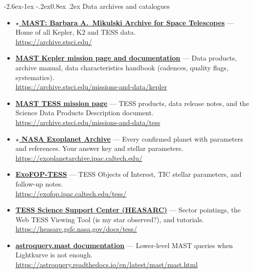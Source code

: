 \documentclass[11pt,a4paper]{article}
\makeatletter
\renewcommand\subsection{\@startsection{subsection}{2}{\z@}%
  {-2.6ex\@plus -1ex \@minus -.2ex}{0.8ex \@plus .2ex}%
  {\normalfont\sffamily\Large\bfseries\color{navy}}}
\newcommand{\res}[3]{\item \textbf{\href{#2}{#1}} --- #3\\[-1pt]{\scriptsize\color{gray}\url{#2}}}
\newenvironment{reslist}{\begin{itemize}\setlength{\itemsep}{5pt}}{\end{itemize}}
\makeatother
\begin{document}
\subsection{Data archives and catalogues}
\begin{reslist}
\res{\(\star\) MAST: Barbara A.\ Mikulski Archive for Space Telescopes}{https://archive.stsci.edu/}{Home of all Kepler, K2 and TESS data.}
\res{MAST Kepler mission page and documentation}{https://archive.stsci.edu/missions-and-data/kepler}{Data products, archive manual, data characteristics handbook (cadences, quality flags, systematics).}
\res{MAST TESS mission page}{https://archive.stsci.edu/missions-and-data/tess}{TESS products, data release notes, and the Science Data Products Description document.}
\res{\(\star\) NASA Exoplanet Archive}{https://exoplanetarchive.ipac.caltech.edu/}{Every confirmed planet with parameters and references. Your answer key and stellar parameters.}
\res{ExoFOP-TESS}{https://exofop.ipac.caltech.edu/tess/}{TESS Objects of Interest, TIC stellar parameters, and follow-up notes.}
\res{TESS Science Support Center (HEASARC)}{https://heasarc.gsfc.nasa.gov/docs/tess/}{Sector pointings, the Web TESS Viewing Tool (is my star observed?), and tutorials.}
\res{astroquery.mast documentation}{https://astroquery.readthedocs.io/en/latest/mast/mast.html}{Lower-level MAST queries when Lightkurve is not enough.}
\end{reslist}
\end{document}
